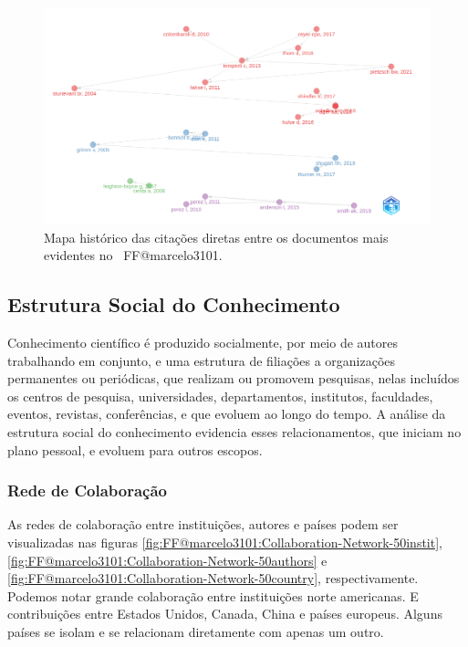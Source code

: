 \begin{figure}
    \centering
    \includegraphics[width=1\textwidth]{exploratory-data-analysis/marcelo3101/PesqBibliogr/ForestFire/WoS-20221204/assets/Historiograph.png}
    \caption{Mapa histórico das citações diretas entre os documentos mais evidentes no  \dataset\ FF@marcelo3101.}
    \label{fig:FF@marcelo3101:HistoricalDirectCitationNetwork-50docs}
\end{figure}

\subsection{Estrutura Social do Conhecimento}

Conhecimento científico é produzido socialmente, por meio de autores trabalhando em conjunto, e uma estrutura de filiações a organizações permanentes ou periódicas, que realizam ou promovem pesquisas, nelas incluídos os centros de pesquisa, universidades, departamentos, institutos, faculdades, eventos, revistas, conferências, e que evoluem ao longo do tempo. A análise da estrutura social do conhecimento evidencia esses relacionamentos, que iniciam no plano pessoal, e evoluem para outros escopos.

\subsubsection{Rede de Colaboração}

As redes de colaboração entre instituições, autores e países podem ser visualizadas nas figuras \ref{fig:FF@marcelo3101:Collaboration-Network-50instit}, \ref{fig:FF@marcelo3101:Collaboration-Network-50authors} e \ref{fig:FF@marcelo3101:Collaboration-Network-50country}, respectivamente. Podemos notar grande colaboração entre instituições norte americanas. E contribuições entre Estados Unidos, Canada, China e países europeus. Alguns países se isolam e se relacionam diretamente com apenas um outro.

